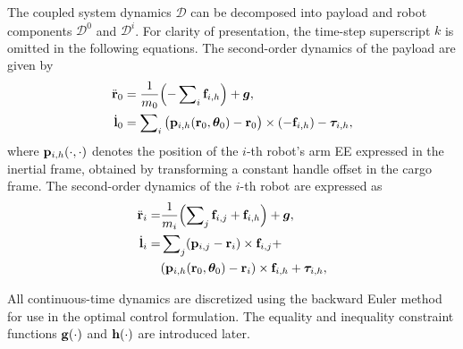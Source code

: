 The coupled system dynamics $\mathcal{D}$ can be decomposed into payload and robot components $\mathcal{D}^0$ and $\mathcal{D}^{i}$. For clarity of presentation, the time-step superscript $k$ is omitted in the following equations. The second-order dynamics of the payload are given by
\begin{subequations}\label{eq:raw_payload_dynamics}
    \begin{align}
        \ddot{\mathbf{r}}_{0} &= \frac{1}{m_0}\!\left(- \sum\nolimits_i \mathbf{f}_{i,h}\right) + \boldsymbol{g}, \\
        \dot{\mathbf{l}}_0 &= \sum\nolimits_i 
        \big(\mathbf{p}_{i,h}(\mathbf{r}_0,\bm{\theta}_0) - \mathbf{r}_0\big) \times (-\mathbf{f}_{i,h})
        - \bm{\tau}_{i,h},
    \end{align}
\end{subequations}
where $\mathbf{p}_{i,h}(\cdot,\cdot)$ denotes the position of the $i$-th robot’s arm EE expressed in the inertial frame, obtained by transforming a constant handle offset in the cargo frame. The second-order dynamics of the $i$-th robot are expressed as
\begin{subequations}\label{eq:raw_robot_dynamics}
    \begin{align}
        \ddot{\mathbf{r}}_{i} =&
        \frac{1}{m_i}\!\left(\sum\nolimits_{j} \mathbf{f}_{i,j} + \mathbf{f}_{i,h}\right) + \boldsymbol{g}, \\
        \dot{\mathbf{l}}_i =&
        \sum\nolimits_j (\mathbf{p}_{i,j} - \mathbf{r}_i) \times \mathbf{f}_{i,j}
        + \\ & (\mathbf{p}_{i,h}(\mathbf{r}_0,\bm{\theta}_0) - \mathbf{r}_i) \times \mathbf{f}_{i,h}
        + \bm{\tau}_{i,h},
    \end{align}
\end{subequations}

All continuous-time dynamics are discretized using the backward Euler method for use in the optimal control formulation. The equality and inequality constraint functions $\mathbf{g}(\cdot)$ and $\mathbf{h}(\cdot)$ are introduced later.